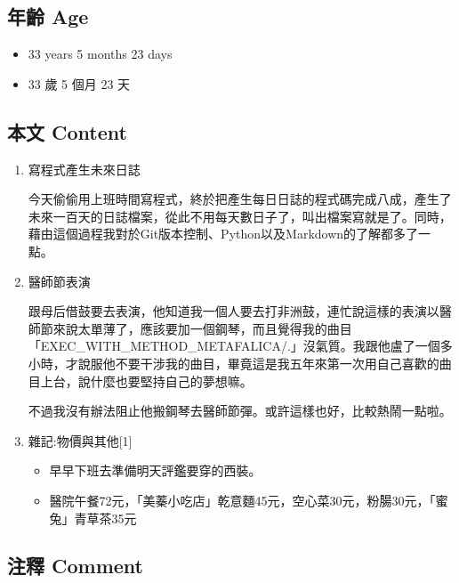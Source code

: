 \documentclass[a5paper, 12pt
]{book}
\providecommand{\tightlist}{%
  \setlength{\itemsep}{0pt}\setlength{\parskip}{0pt}}
\begin{document}
\hypertarget{ux5e74ux9f61-age-17}{%
\subsection{年齡 Age}\label{ux5e74ux9f61-age-17}}

\begin{itemize}
\tightlist
\item
  33 years 5 months 23 days
\item
  33 歲 5 個月 23 天
\end{itemize}

\hypertarget{ux672cux6587-content-17}{%
\subsection{本文 Content}\label{ux672cux6587-content-17}}

\begin{enumerate}
\def\labelenumi{\arabic{enumi}.}
\item
  寫程式產生未來日誌

  今天偷偷用上班時間寫程式，終於把產生每日日誌的程式碼完成八成，產生了未來一百天的日誌檔案，從此不用每天數日子了，叫出檔案寫就是了。同時，藉由這個過程我對於Git版本控制、Python以及Markdown的了解都多了一點。
\item
  醫師節表演

  跟母后借鼓要去表演，他知道我一個人要去打非洲鼓，連忙說這樣的表演以醫師節來說太單薄了，應該要加一個鋼琴，而且覺得我的曲目「EXEC\_WITH\_METHOD\_METAFALICA/.」沒氣質。我跟他盧了一個多小時，才說服他不要干涉我的曲目，畢竟這是我五年來第一次用自己喜歡的曲目上台，說什麼也要堅持自己的夢想嘛。

  不過我沒有辦法阻止他搬鋼琴去醫師節彈。或許這樣也好，比較熱鬧一點啦。
\item
  雜記:物價與其他{[}1{]}

  \begin{itemize}
  \tightlist
  \item
    早早下班去準備明天評鑑要穿的西裝。
  \item
    醫院午餐72元，「美蓁小吃店」乾意麵45元，空心菜30元，粉腸30元，「蜜兔」青草茶35元
  \end{itemize}
\end{enumerate}

\hypertarget{ux6ce8ux91cb-comment-11}{%
\subsection{注釋 Comment}\label{ux6ce8ux91cb-comment-11}}
\end{document}
